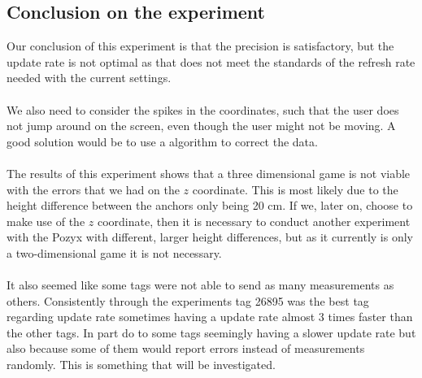 \subsection{Conclusion on the experiment}
Our conclusion of this experiment is that the precision is satisfactory, but the update rate is not optimal as that does not meet the standards of the refresh rate needed with the current settings.
\\\\
We also need to consider the spikes in the coordinates, such that the user does not jump around on the screen, even though the user might not be moving.
A good solution would be to use a algorithm to correct the data.
\\\\
The results of this experiment shows that a three dimensional game is not viable with the errors that we had on the $z$ coordinate. 
This is most likely due to the height difference between the anchors only being 20 cm.
If we, later on, choose to make use of the $z$ coordinate, then it is necessary to conduct another experiment with the Pozyx with different, larger height differences, but as it currently is only a two-dimensional game it is not necessary.
\\\\
It also seemed like some tags were not able to send as many measurements as others.
Consistently through the experiments tag 26895 was the best tag regarding update rate sometimes having a update rate almost 3 times faster than the other tags.
In part do to some tags seemingly having a slower update rate but also because some of them would report errors instead of measurements randomly.
This is something that will be investigated.
